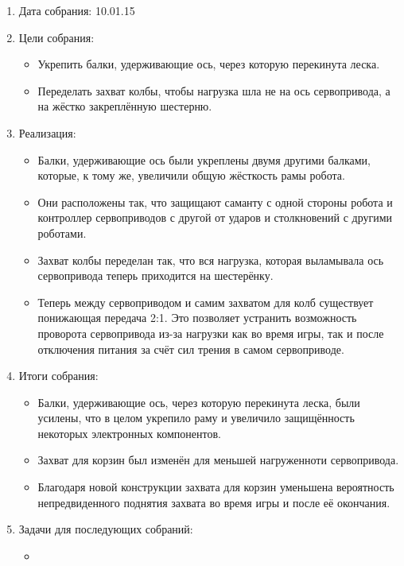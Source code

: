 \begin{enumerate}
  	
  \item Дата собрания: 10.01.15
	
  \item Цели собрания: 
  \begin{itemize}
    \item Укрепить балки, удерживающие ось, через которую перекинута леска. 
		
	\item Переделать захват колбы, чтобы нагрузка шла не на ось сервопривода, а на жёстко закреплённую шестерню.
  \end{itemize}

  \item Реализация:
  \begin{itemize}
    \item Балки, удерживающие ось были укреплены двумя другими балками, которые, к тому же, увеличили общую жёсткость рамы робота. 
    
    \item Они расположены так, что защищают саманту с одной стороны робота и контроллер сервоприводов с другой от ударов и столкновений с другими роботами.
	
	\item Захват колбы переделан так, что вся нагрузка, которая выламывала ось сервопривода теперь приходится на шестерёнку.
	
	\item Теперь между сервоприводом и самим захватом для колб существует понижающая передача 2:1. Это позволяет устранить возможность проворота сервопривода из-за нагрузки как во время игры, так и после отключения питания за счёт сил трения в самом сервоприводе.    
   
  \end{itemize}
	
  \item Итоги собрания:
  \begin{itemize}
	\item Балки, удерживающие ось, через которую перекинута леска, были усилены, что в целом укрепило раму и увеличило защищённость некоторых электронных компонентов.
    
    \item Захват для корзин был изменён для меньшей нагруженноти сервопривода.
    
	\item Благодаря новой конструкции захвата для корзин уменьшена вероятность непредвиденного поднятия захвата во время игры и после её окончания.
	
  \end{itemize}
	
  \item Задачи для последующих собраний:
  \begin{itemize}
    \item 
  \end{itemize}
\end{enumerate}
\fillpage